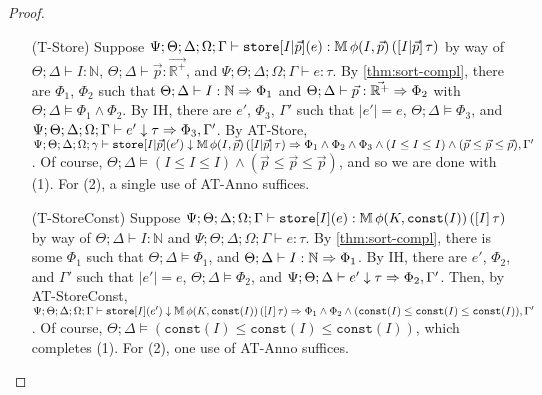 \begin{proof}
\begin{itemize}
  \item[(T-Store)] Suppose
  $\Psi ; \Theta ; \Delta ; \Omega ; \Gamma \vdash \texttt{store}[I|\vec{p}](e) : \mathbb{M} \, \phi(I,\vec{p}) \, ([I| \vec{p}] \, \tau)$ by way of
  $\Theta ; \Delta \vdash I : \mathbb{N}$,
  $\Theta ; \Delta \vdash \vec{p} : \vec{\mathbb{R}^+}$, and
  $\Psi ; \Theta ; \Delta ; \Omega ; \Gamma \vdash e : \tau$.
  By \autoref{thm:sort-compl}, there are $\Phi_1$, $\Phi_2$ such that
  $\Theta ; \Delta \vdash I : \mathbb{N} \Rightarrow \Phi_1$ and
  $\Theta ; \Delta \vdash \vec{p} : \vec{\mathbb{R}^+} \Rightarrow \Phi_2$
  with $\Theta ; \Delta \vDash \Phi_1 \wedge \Phi_2$.
  By IH, there are $e'$, $\Phi_3$, $\Gamma'$ such that
  $|e'| = e$,
  $\Theta ; \Delta \vDash \Phi_3$, and
  $\Psi ; \Theta ; \Delta ; \Omega; \Gamma \vdash e' \downarrow \tau \Rightarrow \Phi_3,\Gamma'$.
  By AT-Store,
  $\Psi ; \Theta ; \Delta ; \Omega ; \gamma \vdash \texttt{store}[I|\vec{p}](e') \downarrow \mathbb{M} \, \phi(I,\vec{p}) \, ([I| \vec{p}] \, \tau) \Rightarrow \Phi_1 \wedge \Phi_2 \wedge \Phi_3 \wedge (I \leq I \leq I) \wedge (\vec{p} \leq \vec{p} \leq \vec{p}),\Gamma'$.
  Of course, $\Theta ; \Delta \vDash (I \leq I \leq I) \wedge (\vec{p} \leq \vec{p} \leq \vec{p})$, and so
  we are done with (1). For (2), a single use of AT-Anno suffices.
  
    
  \item[(T-StoreConst)] Suppose
  $\Psi ; \Theta ; \Delta ; \Omega ; \Gamma \vdash \texttt{store}[I](e) : \mathbb{M} \, \phi(K,\texttt{const}(I)) \, ([I] \, \tau)$ by way of
  $\Theta ; \Delta \vdash I : \mathbb{N}$ and
  $\Psi ; \Theta ; \Delta ; \Omega ; \Gamma \vdash e : \tau$.
  By \autoref{thm:sort-compl}, there is some $\Phi_1$ such that
  $\Theta ; \Delta \vDash \Phi_1$, and
  $\Theta ; \Delta \vdash I : \mathbb{N} \Rightarrow \Phi_1$.
  By IH, there are $e'$, $\Phi_2$, and $\Gamma'$ such that
  $|e'| = e$,
  $\Theta ; \Delta \vDash \Phi_2$, and
  $\Psi ; \Theta ; \Delta \vdash e' \downarrow \tau \Rightarrow \Phi_2,\Gamma'$.
  Then, by AT-StoreConst,
  $\Psi ; \Theta ; \Delta ; \Omega ; \Gamma \vdash \texttt{store}[I](e') \downarrow \mathbb{M} \, \phi(K,\texttt{const}(I)) \, ([I] \, \tau) \Rightarrow \Phi_1 \wedge \Phi_2 \wedge (\texttt{const}(I) \leq \texttt{const}(I) \leq \texttt{const}(I)),\Gamma'$.
  Of course, $\Theta ; \Delta \vDash (\texttt{const}(I) \leq \texttt{const}(I) \leq \texttt{const}(I))$,
  which completes (1). For (2), one use of AT-Anno suffices.


\end{itemize}
\end{proof}
